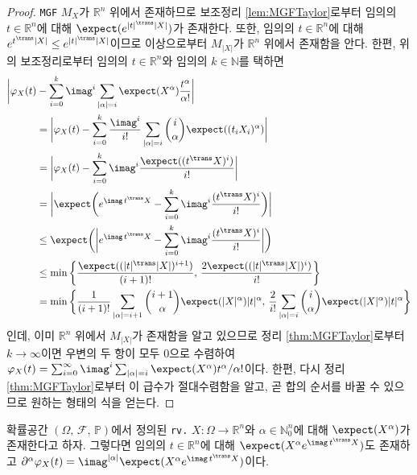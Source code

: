 \begin{proof}
    \texttt{MGF} $M_X$가 $\mathbb{R}^n$ 위에서 존재하므로 보조정리 \ref{lem:MGFTaylor}로부터 임의의 $t\in\mathbb{R}^n$에 대해 $\expect(e^{|t|^\trans|X|})$가 존재한다. 또한, 임의의 $t\in\mathbb{R}^n$에 대해 $e^{t^\trans |X|}\leq e^{|t|^\trans |X|}$이므로 이상으로부터 $M_{|X|}$가 $\mathbb{R}^n$ 위에서 존재함을 안다. 한편, 위의 보조정리로부터 임의의 $t\in\mathbb{R}^n$와 임의의 $k\in\mathbb{N}$를 택하면
    \begin{align*}
        \bigg|\varphi_X(t)&-\sum_{i=0}^k\imag^i\sum_{|\alpha|=i}\expect(X^\alpha)\frac{t^\alpha}{\alpha!}\bigg|\\
        &=\bigg|\varphi_X(t)-\sum_{i=0}^k\frac{\imag^i}{i!}\sum_{|\alpha|=i}\binom{i}{\alpha}\expect((t_iX_i)^\alpha)\bigg|\\
        &=\bigg|\varphi_X(t)-\sum_{i=0}^k\imag^i\frac{\expect((t^\trans X)^i)}{i!}\bigg|\\
        &=\bigg|\expect\bigg(e^{\imag\,t^\trans X}-\sum_{i=0}^k\imag^i\frac{(t^\trans X)^i}{i!}\bigg)\bigg|\\
        &\leq\expect\bigg(\bigg|e^{\imag\,t^\trans X}-\sum_{i=0}^k\imag^i\frac{(t^\trans X)^i}{i!}\bigg|\bigg)\\
        &\leq\min\bigg\{\frac{\expect((|t|^\trans|X|)^{i+1})}{(i+1)!},\,\frac{2\expect((|t|^\trans|X|)^i)}{i!}\bigg\}\\
        &=\min\bigg\{\frac{1}{(i+1)!}\sum_{|\alpha|=i+1}\binom{i+1}{\alpha}\expect(|X|^\alpha)|t|^\alpha,\,\frac{2}{i!}\sum_{|\alpha|=i}\binom{i}{\alpha}\expect(|X|^\alpha)|t|^\alpha\bigg\}
    \end{align*}
    인데, 이미 $\mathbb{R}^n$ 위에서 $M_{|X|}$가 존재함을 알고 있으므로 정리 \ref{thm:MGFTaylor}로부터 $k\to\infty$이면 우변의 두 항이 모두 $0$으로 수렴하여 $\varphi_X(t)=\sum_{i=0}^\infty\imag^i\sum_{|\alpha|=i}\expect(X^\alpha)t^\alpha/\alpha!$이다. 한편, 다시 정리 \ref{thm:MGFTaylor}로부터 이 급수가 절대수렴함을 알고, 곧 합의 순서를 바꿀 수 있으므로 원하는 형태의 식을 얻는다.
\end{proof}

\begin{theorem}\label{thm:CFDifferentiation}
    확률공간 $(\Omega,\,\mathcal{F},\,\mathbb{P})$에서 정의된 \texttt{rv.} $X:\Omega\to\mathbb{R}^n$와 $\alpha\in\mathbb{N}_0^n$에 대해 $\expect(X^\alpha)$가 존재한다고 하자. 그렇다면 임의의 $t\in\mathbb{R}^n$에 대해 $\expect(X^\alpha e^{\imag\,t^\trans X})$도 존재하고 $\partial^\alpha\varphi_X(t)=\imag^{|\alpha|}\expect(X^\alpha e^{\imag\,t^\trans X})$이다.
\end{theorem}

